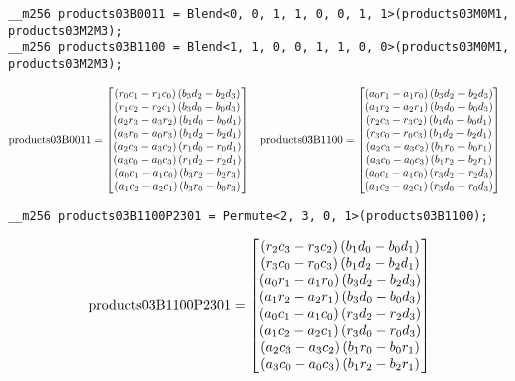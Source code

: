 \begin{verbatim}
__m256 products03B0011 = Blend<0, 0, 1, 1, 0, 0, 1, 1>(products03M0M1, products03M2M3);
__m256 products03B1100 = Blend<1, 1, 0, 0, 1, 1, 0, 0>(products03M0M1, products03M2M3);
\end{verbatim} 
\begin{align*}
\mathrm{products03B0011} 
=
\begin{bmatrix}
\left(r_0c_1 - r_1c_0\right)\left(b_3d_2 - b_2d_3\right)\\
\left(r_1c_2 - r_2c_1\right)\left(b_3d_0 - b_0d_3\right)\\
\left(a_2r_3 - a_3r_2\right)\left(b_1d_0 - b_0d_1\right)\\
\left(a_3r_0 - a_0r_3\right)\left(b_1d_2 - b_2d_1\right)\\
\left(a_2c_3 - a_3c_2\right)\left(r_1d_0 - r_0d_1\right)\\
\left(a_3c_0 - a_0c_3\right)\left(r_1d_2 - r_2d_1\right)\\
\left(a_0c_1 - a_1c_0\right)\left(b_3r_2 - b_2r_3\right)\\
\left(a_1c_2 - a_2c_1\right)\left(b_3r_0 - b_0r_3\right)\\
\end{bmatrix}
&&
\mathrm{products03B1100} 
&=
\begin{bmatrix}
\left(a_0r_1 - a_1r_0\right)\left(b_3d_2 - b_2d_3\right)\\
\left(a_1r_2 - a_2r_1\right)\left(b_3d_0 - b_0d_3\right)\\
\left(r_2c_3 - r_3c_2\right)\left(b_1d_0 - b_0d_1\right)\\
\left(r_3c_0 - r_0c_3\right)\left(b_1d_2 - b_2d_1\right)\\
\left(a_2c_3 - a_3c_2\right)\left(b_1r_0 - b_0r_1\right)\\
\left(a_3c_0 - a_0c_3\right)\left(b_1r_2 - b_2r_1\right)\\
\left(a_0c_1 - a_1c_0\right)\left(r_3d_2 - r_2d_3\right)\\
\left(a_1c_2 - a_2c_1\right)\left(r_3d_0 - r_0d_3\right)\\
\end{bmatrix}
\end{align*}

\begin{verbatim}
__m256 products03B1100P2301 = Permute<2, 3, 0, 1>(products03B1100);
\end{verbatim} 
\begin{align*}
\mathrm{products03B1100P2301} 
=
\begin{bmatrix}
\left(r_2c_3 - r_3c_2\right)\left(b_1d_0 - b_0d_1\right)\\
\left(r_3c_0 - r_0c_3\right)\left(b_1d_2 - b_2d_1\right)\\
\left(a_0r_1 - a_1r_0\right)\left(b_3d_2 - b_2d_3\right)\\
\left(a_1r_2 - a_2r_1\right)\left(b_3d_0 - b_0d_3\right)\\
\left(a_0c_1 - a_1c_0\right)\left(r_3d_2 - r_2d_3\right)\\
\left(a_1c_2 - a_2c_1\right)\left(r_3d_0 - r_0d_3\right)\\
\left(a_2c_3 - a_3c_2\right)\left(b_1r_0 - b_0r_1\right)\\
\left(a_3c_0 - a_0c_3\right)\left(b_1r_2 - b_2r_1\right)\\
\end{bmatrix}
\end{align*}

